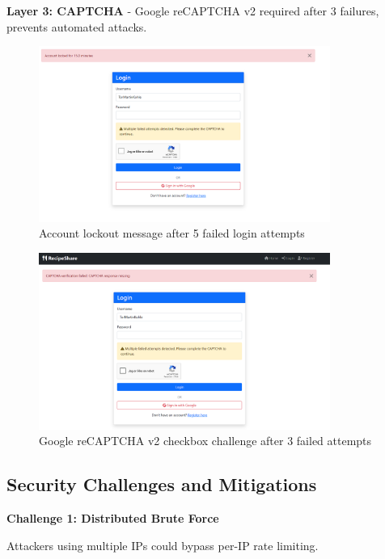 \documentclass[12pt,a4paper]{article}
\begin{document}
\textbf{Layer 3: CAPTCHA} - Google reCAPTCHA v2 required after 3 failures, prevents automated attacks.

\begin{figure}[H]
    \centering
    \includegraphics[width=0.85\textwidth]{screenshots/account_lockout.png}
    \caption{Account lockout message after 5 failed login attempts}
    \label{fig:lockout_screen}
\end{figure}

\begin{figure}[H]
    \centering
    \includegraphics[width=0.85\textwidth]{screenshots/recaptcha_challenge.png}
    \caption{Google reCAPTCHA v2 checkbox challenge after 3 failed attempts}
    \label{fig:captcha}
\end{figure}

\subsection{Security Challenges and Mitigations}

\textbf{Challenge 1: Distributed Brute Force}

Attackers using multiple IPs could bypass per-IP rate limiting.
\end{document}

